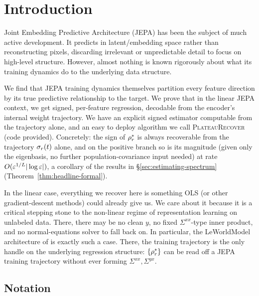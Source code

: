 \section{Introduction}
\label{sec:intro}

Joint Embedding Predictive Architecture (JEPA) has been the subject of much active development. It
predicts in latent/embedding space rather than reconstructing pixels, discarding
irrelevant or unpredictable detail to focus on high-level structure. However, almost nothing is known rigorously about what its training dynamics do to the
underlying data structure.

We find that JEPA training dynamics themselves partition every feature direction by its true
predictive relationship to the target. We prove that in the linear JEPA
context, we get signed, per-feature regression, decodable from the
encoder's internal weight trajectory. We have an explicit signed
estimator computable from the trajectory alone, and an easy to deploy
algorithm we call \textsc{PlateauRecover} (code provided). Concretely:
the sign of $\rho_r^*$ is always recoverable from the trajectory
$\sigma_r(t)$ alone, and on the positive branch so is its magnitude
(given only the eigenbasis, no further population-covariance input
needed) at rate $O(\varepsilon^{1/L}|\log\varepsilon|)$, a corollary of the
results in \S\ref{sec:estimating-spectrum}
(Theorem~\ref{thm:headline-formal}).

\label{ssec:positioning}
In the linear case, everything we recover here is something OLS (or
other gradient-descent methods) could already give us. We care about
it because it is a critical stepping stone to the non-linear regime of
representation learning on unlabeled data. There, there may be no
clean $y$, no fixed $\Sigma^{xx}$-type inner product, and no
normal-equations solver to fall back on. In particular, the
LeWorldModel architecture of \citet{Maes2026LeWM} is exactly such a
case. There, the training trajectory is the only handle on the
underlying regression structure: $\{\rho_r^*\}$ can be read off a
JEPA training trajectory without ever forming $\Sigma^{xx}, \Sigma^{yx}$.

\subsection*{Notation}

